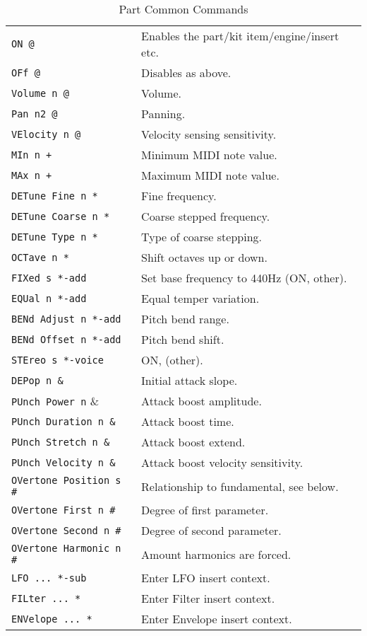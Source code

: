 \begin{center}
\begin{longtable}{p{4cm} p{10cm}}
\caption[Part Common Commands]{Part Common Commands} \\

\texttt{ON @} &
   Enables the part/kit item/engine/insert etc. \\
\texttt{OFf @} &
   Disables as above.   \\
\texttt{Volume n @} &
   Volume.  \\
\texttt{Pan n2 @} &
   Panning. \\
\texttt{VElocity n @} &
   Velocity sensing sensitivity. \\
\texttt{MIn n +} &
   Minimum MIDI note value.   \\
\texttt{MAx n +} &
   Maximum MIDI note value.   \\
\texttt{DETune Fine n *} &
   Fine frequency.   \\
\texttt{DETune Coarse n *} &
   Coarse stepped frequency.  \\
\texttt{DETune Type n *} &
   Type of coarse stepping.   \\
\texttt{OCTave n *} &
   Shift octaves up or down.  \\
\texttt{FIXed s *-add} &
   Set base frequency to 440Hz (ON, other).  \\
\texttt{EQUal n *-add} &
   Equal temper variation. \\
\texttt{BENd Adjust n  *-add} &
   Pitch bend range. \\
\texttt{BENd Offset n  *-add} &
   Pitch bend shift. \\
\texttt{STEreo s *-voice} &
   ON, (other).   \\
\texttt{DEPop n \&} &
   Initial attack slope.   \\
\texttt{PUnch Power n} \& &
   Attack boost amplitude. \\
\texttt{PUnch Duration n \&} &
   Attack boost time.   \\
\texttt{PUnch Stretch n \&} &
   Attack boost extend. \\
\texttt{PUnch Velocity n \&} &
   Attack boost velocity sensitivity.  \\
\texttt{OVertone Position s \#} &
   Relationship to fundamental, see below. \\
\texttt{OVertone First n \#} &
   Degree of first parameter. \\
\texttt{OVertone Second n \#} &
   Degree of second parameter.   \\
\texttt{OVertone Harmonic n \#} &
   Amount harmonics are forced.  \\
\texttt{LFO ... *-sub} &
   Enter LFO insert context.  \\
\texttt{FILter ... *} &
   Enter Filter insert context.  \\
\texttt{ENVelope ... *} &
   Enter Envelope insert context.   \\

\end{longtable}
\end{center}

